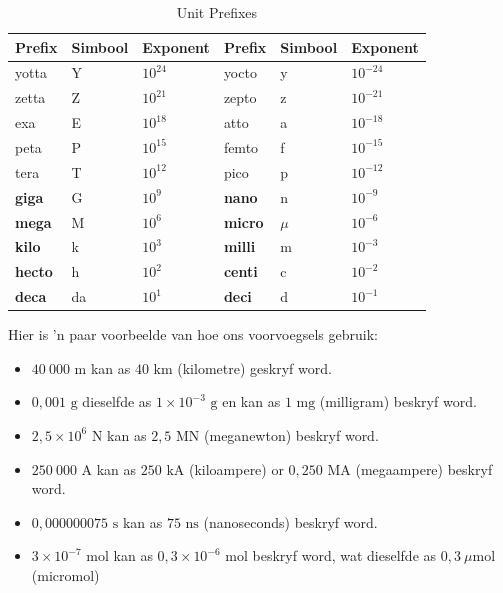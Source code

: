 \begin{table}[H]
        \begin{center}
    \noindent
      \begin{tabular}{|l|l|l|l|l|l|}\hline
\textbf{Prefix} & \textbf{Simbool}  & \textbf{Exponent} & \textbf{Prefix} & \textbf{Simbool} & \textbf{Exponent} \\ \hline
yotta           & Y                & ${10}^{24}$       & yocto           & y               & ${10}^{-24}$      \\ \hline
zetta           &  Z               & ${10}^{21}$       &  zepto          & z               & ${10}^{-21}$      \\ \hline
exa             &  E               & ${10}^{18}$       & atto            & a               & ${10}^{-18}$      \\ \hline
peta            & P                & ${10}^{15}$       & femto           & f               & ${10}^{-15}$      \\ \hline
tera            &  T               & ${10}^{12}$       &  pico           & p               & ${10}^{-12}$      \\ \hline
\textbf{giga}   & G                & ${10}^{9}$        & \textbf{nano}   & n               & ${10}^{-9}$       \\ \hline
\textbf{mega}   &  M               & ${10}^{6}$        & \textbf{micro}  & $\mu $          & ${10}^{-6}$       \\ \hline
\textbf{kilo}   &  k               & ${10}^{3}$        & \textbf{milli}  & m               & ${10}^{-3}$       \\ \hline
\textbf{hecto}  &  h               & ${10}^{2}$        & \textbf{centi}  & c               & ${10}^{-2}$       \\ \hline
\textbf{deca}   &  da              & ${10}^{1}$        & \textbf{deci}   & d               & ${10}^{-1}$       \\ \hline
    \end{tabular}
\caption{Unit Prefixes}
      \end{center}
\label{tab:unitprefixes}
\end{table}
Hier is  'n paar voorbeelde van hoe ons voorvoegsels gebruik:
\begin{itemize}[noitemsep]
  \item $40~000 \text{ m}$ kan as $40 \text{ km}$ (kilometre) geskryf word.
  \item $0,001 \text{ g}$ dieselfde as $1 \times{10}^{-3} \text{ g}$ en kan as $1 \text{ mg}$ (milligram) beskryf word.
  \item $2,5 \times {10}^{6}$ N kan as $2,5 \text{ MN}$ (meganewton) beskryf word.
  \item $250~000 \text{ A}$ kan as $250 \text{ kA}$ (kiloampere) or $0,250 \text{ MA}$ (megaampere) beskryf word.
  \item $0,000000075 \text{ s}$ kan as $75 \text{ ns}$ (nanoseconds) beskryf word.
  \item $3 \times{10}^{-7} \text{ mol}$ kan as $0,3 \times{10}^{-6} \text{ mol}$ beskryf word, wat dieselfde as $0,3 ~\mu \text{mol}$ (micromol)
\end{itemize}
